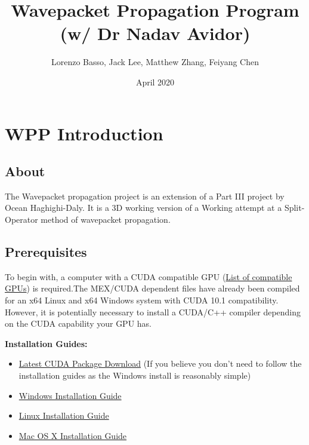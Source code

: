 \documentclass[11pt,letterpaper]{article}
\title{Wavepacket Propagation Program (w/ Dr Nadav Avidor)}
\author{Lorenzo Basso, Jack Lee, Matthew Zhang, Feiyang Chen}
\date{April 2020}
\renewcommand{\\}{\bigskip}
\begin{document}
\maketitle

\tableofcontents


\pagestyle{fancy}
\renewcommand{\subsectionmark}[1]{\markright{#1}{}}
\fancyfoot[C]{\thepage}%
\fancyhead[L]{\leftmark}
\fancyhead[R]{\rightmark}

\newpage

\section{WPP Introduction}
\subsection{About}

The Wavepacket propagation project is an extension of a Part III project by Ocean Haghighi-Daly. It is a 3D working version of a Working attempt at a Split-Operator method of wavepacket propagation. 


\subsection{Prerequisites}

To begin with, a computer with a CUDA compatible GPU (\href{https://developer.nvidia.com/cuda-gpus#compute}{List of compatible GPUs}) is required.The MEX/CUDA dependent files have already been compiled for an x64 Linux and x64 Windows system with CUDA 10.1 compatibility. However, it is potentially necessary to install a CUDA/C++ compiler depending on the CUDA capability your GPU has.\\

\textbf{Installation Guides:}

\begin{itemize}
    \item \href{https://developer.nvidia.com/cuda-downloads?target_os=Windows&target_arch=x86_64}{Latest CUDA Package Download} (If you believe you don't need to follow the installation guides as the Windows install is reasonably simple)
    \item \href{https://docs.nvidia.com/cuda/cuda-installation-guide-microsoft-windows/index.html}{Windows Installation Guide}
    \item \href{https://docs.nvidia.com/cuda/cuda-installation-guide-linux/index.html}{Linux Installation Guide}
    \item \href{https://docs.nvidia.com/cuda/cuda-installation-guide-mac-os-x/index.html}{Mac OS X Installation Guide}
\end{itemize}
\end{document}
